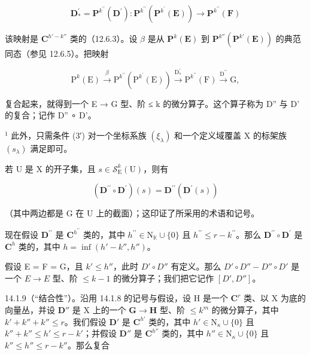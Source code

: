 \[
\mathbf {D} _ {*} ^ {\prime} = \mathbf {P} ^ {k ^ {\prime \prime}} (\mathbf {D} ^ {\prime}) \colon \mathbf {P} ^ {k ^ {\prime \prime}} (\mathbf {P} ^ {k ^ {\prime}} (\mathbf {E})) \rightarrow \mathbf {P} ^ {k ^ {\prime \prime}} (\mathbf {F})
\]

该映射是 \(\mathbf{C}^{h'-k''}\) 类的（12.6.3）。设 \(\beta\) 是从 \(\mathbf{P}^{k}(\mathbf{E})\) 到 \(\mathbf{P}^{k''}(\mathbf{P}^{k'}(\mathbf{E}))\) 的典范同态（参见 12.6.5）。把映射

\[
\mathrm{P} ^ {k} (\mathrm{E}) \xrightarrow {\beta} \mathrm{P} ^ {k ^ {\prime \prime}} (\mathrm{P} ^ {k ^ {\prime}} (\mathrm{E})) \xrightarrow {\mathrm{D} _ {*} ^ {\prime}} \mathrm{P} ^ {k ^ {\prime \prime}} (\mathrm{F}) \xrightarrow {\mathrm{D} ^ {\prime \prime}} \mathrm{G},
\]

复合起来，就得到一个 E → G 型、阶 ≤ k 的微分算子。这个算子称为 D'' 与 D' 的复合；记作 D'' ∘ D'。

\(^{1}\) 此外，只需条件 (3′) 对一个坐标系族 \((\xi_{\lambda})\) 和一个定义域覆盖 X 的标架族 \((s_{\lambda})\) 满足即可。

若 U 是 X 的开子集，且 \(s \in \mathcal{S}_{\mathrm{E}}^{k}(\mathrm{U})\)，则有

\[
(\mathbf {D} ^ {\prime \prime} \circ \mathbf {D} ^ {\prime}) (s) = \mathbf {D} ^ {\prime \prime} (\mathbf {D} ^ {\prime} (s))
\]

（其中两边都是 G 在 U 上的截面）；这印证了所采用的术语和记号。

现在假设 \(\mathbf{D}^{\prime \prime}\) 是 \(\mathbf{C}^{h^{\prime \prime}}\) 类的，其中 \(h^{\prime \prime} \in \mathrm{N}_{\mathbb{K}} \cup \{0\}\) 且 \(h^{\prime \prime} \leqslant r-k^{\prime\prime}\)。那么 \(\mathbf{D}^{\prime \prime} \circ \mathbf{D}^{\prime}\) 是 \(\mathbf{C}^{h}\) 类的，其中 \(h=\inf(h'-k'',h'')\)。

假设 E = F = G，且 \(k' \leqslant h''\)，此时 \(D' \circ D''\) 有定义。那么 \(D' \circ D'' - D'' \circ D'\) 是一个 \(E \to E\) 型、阶 \(\leqslant k - 1\) 的微分算子；我们把它记作 \([D', D'']\)。

14.1.9（“结合性”）。沿用 14.1.8 的记号与假设，设 H 是一个 \(\mathbf{C}^r\) 类、以 X 为底的向量丛，并设 \(\mathbf{D}''\) 是 X 上的一个 \(\mathbf{G} \to \mathbf{H}\) 型、阶 \(\leqslant k^{m}\) 的微分算子，其中 \(k' + k'' + k'' \leqslant r\)。我们假设 \(\mathbf{D}'\) 是 \(\mathbf{C}^{h'}\) 类的，其中 \(h' \in \mathrm{N}_{\kappa} \cup \{0\}\) 且 \(k'' + k'' \leqslant h' \leqslant r - k'\)；并假设 \(\mathbf{D}''\) 是 \(\mathbf{C}^{h''}\) 类的，其中 \(h'' \in \mathrm{N}_{\kappa} \cup \{0\}\) 且 \(k'' \leqslant h'' \leqslant r - k''\)。那么复合

